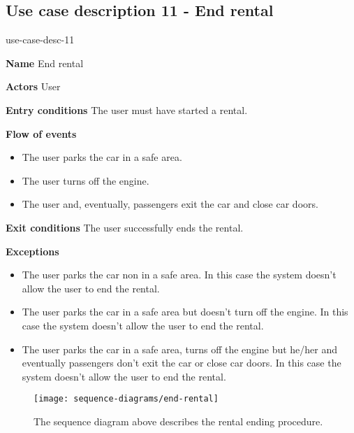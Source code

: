 \subsection{Use case description 11 - End rental}
\begin{labeling}{use-case-desc-11}
	\item[\textbf{Name}] End rental
	\item[\textbf{Actors}] User
	\item[\textbf{Entry conditions}] The user must have started a rental.
	\item[\textbf{Flow of events}]
		\begin{itemize}
			\item[]
			\item The user parks the car in a safe area.
			\item The user turns off the engine.
			\item The user and, eventually, passengers exit the car and close car doors.
		\end{itemize}
	\item[\textbf{Exit conditions}] The user successfully ends the rental.
	\item[\textbf{Exceptions}]
		\begin{itemize}
			\item[]
			\item The user parks the car non in a safe area. In this case the system doesn't allow the user to end the rental.
			\item The user parks the car in a safe area but doesn't turn off the engine. In this case the system doesn't allow the user to end the rental.
			\item The user parks the car in a safe area, turns off the engine but he/her and eventually passengers don't exit the car or close car doors. In this case the system doesn't allow the user to end the rental.  
		\end{itemize}
\end{labeling}
\begin{figure}[H]
	\centering
	\texttt{[image: sequence-diagrams/end-rental]}
	\caption[Sequence diagram - End rental]{The sequence diagram above describes the rental ending procedure.}
	\label{fig:end-rental-sequence-diagram}
\end{figure}
\clearpage
